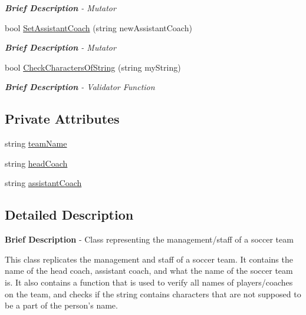 \begin{DoxyCompactItemize}
\begin{DoxyCompactList}\small\item\em {\bfseries Brief Description} -\/ Mutator \end{DoxyCompactList}\item 
bool \hyperlink{class_management_a5d4d5d0bc503032c9c26ce15c62bbec8}{Set\-Assistant\-Coach} (string new\-Assistant\-Coach)
\begin{DoxyCompactList}\small\item\em {\bfseries Brief Description} -\/ Mutator \end{DoxyCompactList}\item 
bool \hyperlink{class_management_a4679efc7274b90fa967dc1349d247093}{Check\-Characters\-Of\-String} (string my\-String)
\begin{DoxyCompactList}\small\item\em {\bfseries Brief Description} -\/ Validator Function \end{DoxyCompactList}\end{DoxyCompactItemize}
\subsection*{Private Attributes}
\begin{DoxyCompactItemize}
\item 
string \hyperlink{class_management_a78344be52d9cb5025226b4939e562901}{team\-Name}
\item 
string \hyperlink{class_management_aaec7a4d4d85085cc58237f23b29648bc}{head\-Coach}
\item 
string \hyperlink{class_management_a0255211caa5f03eaf86491d069e36921}{assistant\-Coach}
\end{DoxyCompactItemize}


\subsection{Detailed Description}
{\bfseries Brief Description} -\/ Class representing the management/staff of a soccer team 

This class replicates the management and staff of a soccer team. It contains the name of the head coach, assistant coach, and what the name of the soccer team is. It also contains a function that is used to verify all names of players/coaches on the team, and checks if the string contains characters that are not supposed to be a part of the person's name.


